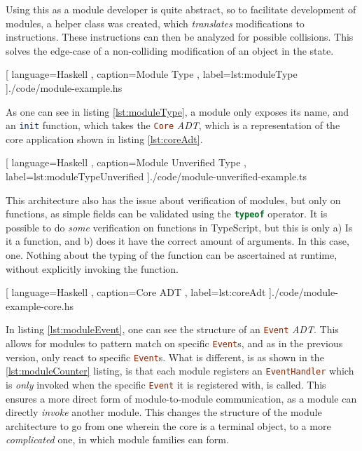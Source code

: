 Using this as a module developer is quite abstract, so to facilitate development
of modules, a helper class was created, which \textit{translates} modifications
to instructions. These instructions can then be analyzed for possible
collisions. This solves the edge-case of a non-colliding modification of an
object in the state.

\begin{center}
  
   [ language=Haskell
   , caption={Module Type}
   , label=lst:moduleType
   ]{./code/module-example.hs}
\end{center}

As one can see in listing \ref{lst:moduleType}, a module only exposes its name,
and an \lstinline[language=haskell]{init} function, which takes the
\lstinline[language=haskell]{Core} \textit{ADT}, which is a representation of
the core application shown in listing \ref{lst:coreAdt}.

\begin{center}
  
   [ language=Haskell
   , caption={Module Unverified Type}
   , label=lst:moduleTypeUnverified
   ]{./code/module-unverified-example.ts}
\end{center}

This architecture also has the issue about verification of modules, but only on
functions, as simple fields can be validated using the
\lstinline[language=JavaScript]{typeof} operator. It is possible to do
\textit{some} verification on functions in TypeScript, but this is only a) Is it
a function, and b) does it have the correct amount of arguments. In this case,
one. Nothing about the typing of the function can be ascertained at runtime,
without explicitly invoking the function.

\begin{center}
  
    [ language=Haskell
    , caption={Core ADT}
    , label=lst:coreAdt
    ]{./code/module-example-core.hs}
\end{center}

In listing \ref{lst:moduleEvent}, one can see the structure of an
\lstinline[language=Haskell]{Event} \textit{ADT}. This allows for modules to
pattern match on specific \lstinline[language=Haskell]{Event}s, and as in the
previous version, only react to specific \lstinline[language=Haskell]{Event}s.
What is different, is as shown in the \ref{lst:moduleCounter} listing, is that
each module registers an \lstinline[language=Haskell]{EventHandler} which is
\textit{only} invoked when the specific \lstinline[language=Haskell]{Event} it
is registered with, is called. This ensures a more direct form of
module-to-module communication, as a module can directly \textit{invoke} another
module. This changes the structure of the module architecture to go from one
wherein the core is a terminal object, to a more \textit{complicated} one, in
which module families can form.

